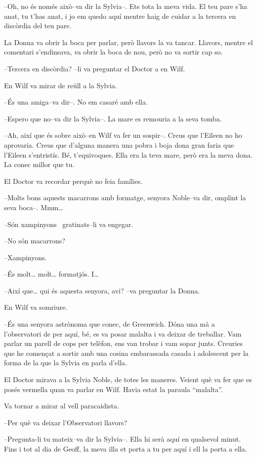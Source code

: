 --Oh, no és només això--va dir la Sylvia--. Ets tota la meva vida. El
teu pare s'ha anat, tu t'has anat, i jo em quedo aquí mentre haig de
cuidar a la tercera en discòrdia del teu pare.

La Donna va obrir la boca per parlar, però llavors la va tancar.
Llavors, mentre el comentari s'endinsava, va obrir la boca de nou, però
no va sortir cap so.

--Tercera en discòrdia? --li va preguntar el Doctor a en Wilf.

En Wilf va mirar de reüll a la Sylvia.

--És una amiga--va dir--. No em casaré amb ella.

--Espero que no--va dir la Sylvia--. La mare es remouria a la seva
tomba.

--Ah, així que és sobre això--en Wilf va fer un sospir--. Creus que
l'Eileen no ho aprovaria. Creus que d'alguna manera una pobra i boja
dona gran faria que l'Eileen s'entristís. Bé, t'equivoques. Ella era la
teva mare, però era la meva dona. La conec millor que tu.

El Doctor va recordar perquè no feia famílies.

--Molts bons aquests macarrons amb formatge, senyora Noble--va dir,
omplint la seva boca--. Mmm\ldots{}

--Són xampinyons ~gratinats--li va engegar.

--No són macarrons?

--Xampinyons.

--És molt\ldots{} molt\ldots{} formatjós. I\ldots{}

--Així que\ldots{} qui és aquesta senyora, avi? --va preguntar la Donna.

En Wilf va somriure.

--És una senyora astrònoma que conec, de Greenwich. Dóna una mà a
l'observatori de per aquí, bé, es va posar malalta i va deixar de
treballar. Vam parlar un parell de cops per telèfon, ens van trobar i
vam sopar junts. Creuries que he començat a sortir amb una cosina
embarassada casada i adolescent per la forma de la que la Sylvia en
parla d'ella.

El Doctor mirava a la Sylvia Noble, de totes les maneres. Veient què va
fer que es posés vermella quan va parlar en Wilf. Havia estat la paraula
``malalta''.

Va tornar a mirar al vell paracaidista.

--Per què va deixar l'Observatori llavors?

--Pregunta-li tu mateix--va dir la Sylvia--. Ella hi serà aquí en
qualsevol minut. Fins i tot al dia de Geoff, la meva illa et porta a tu
per aquí i ell la porta a ella.

